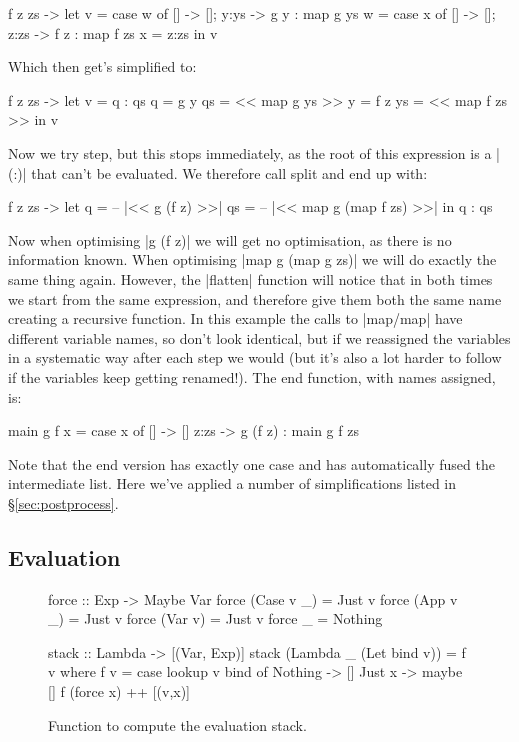 \documentclass{sigplanconf}
\begin{document}
\begin{code}
\g f z zs ->  let  v = case  w of {[] -> []; y:ys -> g y : map g ys}
                   w = case  x of {[] -> []; z:zs -> f z : map f zs}
                   x = z:zs
              in   v
\end{code}

Which then get's simplified to:

\begin{code}
\g f z zs ->  let  v = q : qs
                   q = g y
                   qs = << map g ys >>
                   y = f z
                   ys = << map f zs >>
              in   v
\end{code}

Now we try step, but this stops immediately, as the root of this expression is a |(:)| that can't be evaluated. We therefore call split and end up with:

\begin{code}
\g f z zs ->  let  q = -- |<< g (f z) >>|
                   qs = -- |<< map g (map f zs) >>|
              in   q : qs
\end{code}

Now when optimising |g (f z)| we will get no optimisation, as there is no information known. When optimising |map g (map g zs)| we will do exactly the same thing again. However, the |flatten| function will notice that in both times we start from the same expression, and therefore give them both the same name creating a recursive function. In this example the calls to |map/map| have different variable names, so don't look identical, but if we reassigned the variables in a systematic way after each step we would (but it's also a lot harder to follow if the variables keep getting renamed!). The end function, with names assigned, is:

\begin{code}
main g f x = case x of
    [] -> []
    z:zs -> g (f z) : main g f zs
\end{code}

Note that the end version has exactly one case and has automatically fused the intermediate list. Here we've applied a number of simplifications listed in \S\ref{sec:postprocess}.

\subsection{Evaluation}
\label{sec:eval}

\begin{figure}
\begin{code}
force :: Exp -> Maybe Var
force (Case v _) = Just v
force (App v _) = Just v
force (Var v) = Just v
force _ = Nothing

stack :: Lambda -> [(Var, Exp)]
stack (Lambda _ (Let bind v)) = f v
    where f v = case lookup v bind of
                     Nothing -> []
                     Just x -> maybe [] f (force x) ++ [(v,x)]
\end{code}
\caption{Function to compute the evaluation stack.}
\label{fig:stack}
\end{figure}
\end{document}
